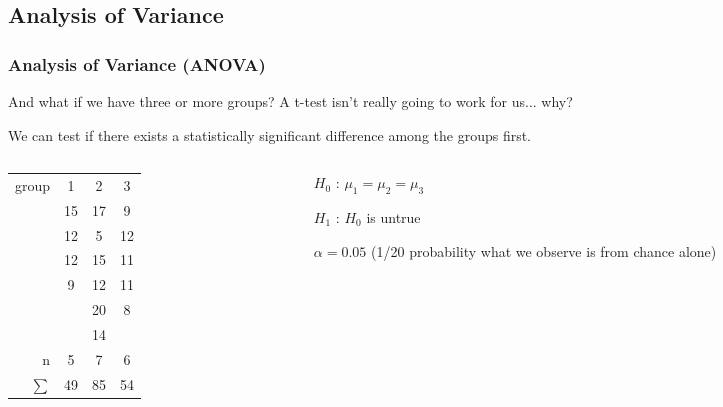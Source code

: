 \documentclass{beamer} %
\begin{document}
	\subsection{Analysis of Variance}
	\begin{frame}
		\frametitle{Analysis of Variance (ANOVA)}
		And what if we have three or more groups? A t-test isn't really going to work for us... why?

		We can test if there exists a statistically significant difference among the groups first.\vspace{.125in}

		\begin{columns}
			\begin{column}{.5\linewidth}
				\begin{tabular}{ r | c | c | c }
					group 	& 1 & 2 & 3 \\
					~ 		& 15 & 17 & 9 \\
					~ 		& 12 & 5 & 12 \\
					~ 		& 12 & 15 & 11 \\
					~ 		& 9 & 12 & 11 \\
					~ 		& ~ & 20 & 8 \\
					~ 		& ~ & 14 & ~ \\
					\midrule
					n 		& 5 & 7 & 6 \\
					$\sum$ 	& 49 & 85 & 54 \\
				\end{tabular}
			\end{column}
			\begin{column}{.5\linewidth}
				$H_0$ : $\mu_1 = \mu_2 = \mu_3$ \vspace{.125in}

				$H_1$ : $H_0$ is untrue \vspace{.125in}

				$\alpha = 0.05$ (1/20 probability what we observe is from chance alone)
			\end{column}
		\end{columns}
	\end{frame}
\end{document}
